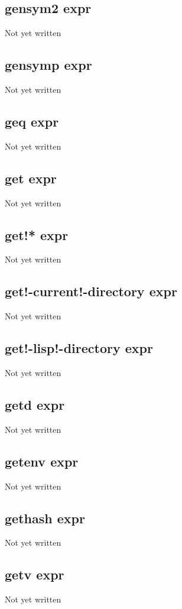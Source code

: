 \documentclass[a4paper,11pt]{article}
\begin{document}
{\subsection{\ttfamily gensym2 expr}
   Not yet written

\subsection{\ttfamily gensymp expr}
   Not yet written

\subsection{\ttfamily geq expr}
   Not yet written

\subsection{\ttfamily get expr}
   Not yet written

\subsection{\ttfamily get!* expr}
   Not yet written

\subsection{\ttfamily get!-current!-directory expr}
   Not yet written

\subsection{\ttfamily get!-lisp!-directory expr}
   Not yet written

\subsection{\ttfamily getd expr}
   Not yet written

\subsection{\ttfamily getenv expr}
   Not yet written

\subsection{\ttfamily gethash expr}
   Not yet written

\subsection{\ttfamily getv expr}
   Not yet written

}
\end{document}
